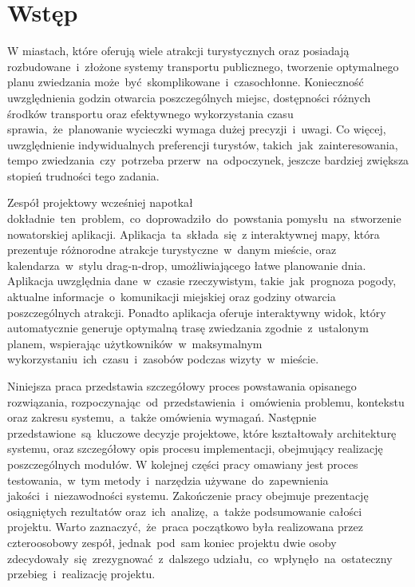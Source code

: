 
\chapter{Wstęp}
\label{ch:wstep}

W miastach, które oferują wiele atrakcji turystycznych oraz posiadają rozbudowane~i~złożone systemy transportu publicznego, tworzenie optymalnego planu zwiedzania może~być~skomplikowane~i~czasochłonne.
Konieczność uwzględnienia godzin otwarcia poszczególnych miejsc, dostępności różnych środków transportu oraz efektywnego wykorzystania czasu sprawia,~że~planowanie wycieczki wymaga dużej precyzji~i~uwagi.
Co więcej, uwzględnienie indywidualnych preferencji turystów, takich~jak~zainteresowania, tempo zwiedzania~czy~potrzeba przerw~na~odpoczynek, jeszcze bardziej zwiększa stopień trudności tego zadania.

Zespół projektowy wcześniej napotkał dokładnie~ten~problem,~co~doprowadziło~do~powstania pomysłu~na~stworzenie nowatorskiej aplikacji.
Aplikacja~ta~składa~się~z interaktywnej mapy, która prezentuje różnorodne atrakcje turystyczne~w~danym mieście, oraz kalendarza~w~stylu \gls{drag-n-drop}, umożliwiającego łatwe planowanie dnia.
Aplikacja uwzględnia dane~w~czasie rzeczywistym, takie~jak~prognoza pogody, aktualne informacje~o~komunikacji miejskiej oraz godziny otwarcia poszczególnych atrakcji.
Ponadto aplikacja oferuje interaktywny widok, który automatycznie generuje optymalną trasę zwiedzania zgodnie~z~ustalonym planem, wspierając użytkowników~w~maksymalnym wykorzystaniu~ich~czasu~i~zasobów podczas wizyty~w~mieście.

Niniejsza praca przedstawia szczegółowy proces powstawania opisanego rozwiązania, rozpoczynając~od~przedstawienia~i~omówienia problemu, kontekstu oraz zakresu systemu,~a~także omówienia wymagań.
Następnie przedstawione~są~kluczowe decyzje projektowe, które kształtowały architekturę systemu, oraz szczegółowy opis procesu implementacji, obejmujący realizację poszczególnych modułów.
W kolejnej części pracy omawiany jest proces testowania,~w~tym metody~i~narzędzia używane~do~zapewnienia jakości~i~niezawodności systemu.
Zakończenie pracy obejmuje prezentację osiągniętych rezultatów oraz~ich~analizę,~a~także podsumowanie całości projektu.
Warto zaznaczyć,~że~praca początkowo była realizowana przez czteroosobowy zespół, jednak~pod~sam koniec projektu dwie osoby zdecydowały~się~zrezygnować~z~dalszego udziału,~co~wpłynęło~na~ostateczny przebieg~i~realizację projektu.
